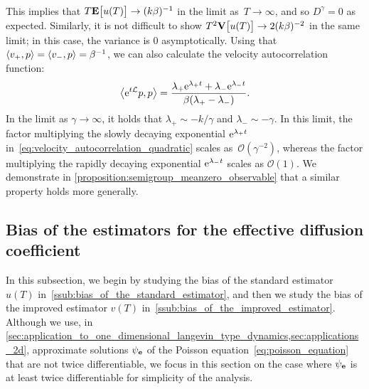 \documentclass[11pt,a4paper]{article}
\begin{document}
\begin{example}
\begin{align*}
    \end{align*}
    This implies that
    \(
        T \mathbf{E} \bigl[ u(T) \bigr] \to (k \beta)^{-1}
    \)
    in the limit as~$T \to \infty$,
    and so $D^{\gamma} = 0$ as expected.
    Similarly, it is not difficult to show $T^2\mathbf{V} \bigl[ u(T) \bigr] \to 2 (k \beta)^{-2}$ in the same limit;
    in this case, the variance is 0 asymptotically.
    Using that $\ip{v_+}{p} = \ip{v_-}{p} = \beta^{-1}$,
    we can also calculate the velocity autocorrelation function:
    \begin{equation}
        \label{eq:velocity_autocorrelation_quadratic}
        \ip{\e^{t \mathcal L}p}{p} =
        \frac{\lambda_+ \e^{\lambda_+ t} + \lambda_- \e^{\lambda_- t}}{\beta(\lambda_+ - \lambda_-)}.
    \end{equation}
    In the limit as $\gamma \to \infty$,
    it holds that $\lambda_+ \sim - k/\gamma$ and $\lambda_- \sim - \gamma$.
    In this limit,
    the factor multiplying the slowly decaying exponential $\mathrm{e}^{\lambda_+ t}$ in~\eqref{eq:velocity_autocorrelation_quadratic} scales as~$\mathcal O(\gamma^{-2})$,
    whereas the factor multiplying the rapidly decaying exponential $\mathrm{e}^{\lambda_- t}$ scales as $\mathcal O(1)$.
    We demonstrate in \cref{proposition:semigroup_meanzero_observable} that a similar property holds more generally.
\end{example}

\subsection{Bias of the estimators for the effective diffusion coefficient}%
\label{sub:bias}

In this subsection,
we begin by studying the bias of the standard estimator $u(T)$ in~\cref{ssub:bias_of_the_standard_estimator},
and then we study the bias of the improved estimator $v(T)$ in~\cref{ssub:bias_of_the_improved_estimator}.
Although we use, in \cref{sec:application_to_one_dimensional_langevin_type_dynamics,sec:applications_2d},
approximate solutions $\psi_{\boldsymbol{\mathbf e}}$ of the Poisson equation~\eqref{eq:poisson_equation} that are not twice differentiable,
we focus in this section on the case where $\psi_{\boldsymbol{\mathbf e}}$ is at least twice differentiable for simplicity of the analysis.
\end{document}
